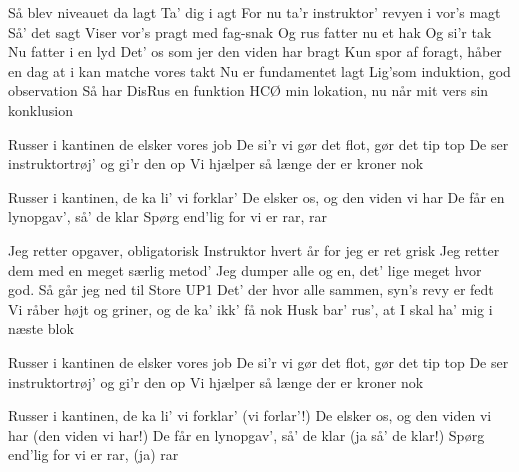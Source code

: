 \documentclass[a4paper,11pt]{article}
\begin{document}
\begin{song}
 Så blev niveauet da lagt
Ta' dig i agt
For nu ta'r instruktor' revyen i vor's magt
Så' det sagt
Viser vor's pragt med fag-snak
Og rus fatter nu et hak
Og si'r tak
Nu fatter i en lyd
Det' os som jer den viden har bragt
Kun spor af foragt, håber en dag at i kan matche vores takt
Nu er fundamentet lagt
Lig'som induktion, god observation
Så har DisRus en funktion
HCØ min lokation, nu når mit vers sin konklusion

 Russer i kantinen de elsker vores job
De si'r vi gør det flot, gør det tip top
De ser instruktortrøj' og gi'r den op
Vi hjælper så længe der er kroner nok

 Russer i kantinen, de ka li' vi forklar'
De elsker os, og den viden vi har
De får en lynopgav', så' de klar
Spørg end'lig for vi er rar, rar

 Jeg retter opgaver, obligatorisk
Instruktor hvert år for jeg er ret grisk
Jeg retter dem med en meget særlig metod'
Jeg dumper alle og en, det' lige meget hvor god.
Så går jeg ned til Store UP1
Det' der hvor alle sammen, syn's revy er fedt
Vi råber højt og griner, og de ka' ikk' få nok
Husk bar' rus', at I skal ha' mig i næste blok

 Russer i kantinen de elsker vores job
De si'r vi gør det flot, gør det tip top
De ser instruktortrøj' og gi'r den op
Vi hjælper så længe der er kroner nok

 Russer i kantinen, de ka li' vi forklar' (vi forlar'!)
De elsker os, og den viden vi har (den viden vi har!)
De får en lynopgav', så' de klar (ja så' de klar!)
Spørg end'lig for vi er rar, (ja) rar
\end{song}
\end{document}
